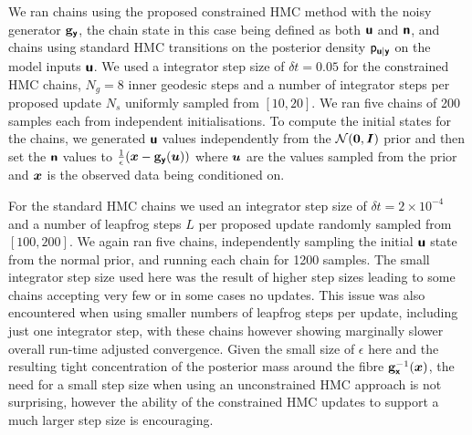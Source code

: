 
We ran chains using the proposed constrained \ac{HMC} method with the noisy generator ${\mathbf{g}}_{\boldsymbol{\mathsf{y}}}$, the chain state in this case being defined as both $\boldsymbol{\mathsf{u}}$ and $\boldsymbol{\mathsf{n}}$, and chains using standard \ac{HMC} transitions on the posterior density $\mathsf{p}_{\boldsymbol{\mathsf{u}}|\boldsymbol{\mathsf{y}}}$ on the model inputs $\boldsymbol{\mathsf{u}}$. We used a integrator step size of $\delta t = 0.05$ for the constrained \ac{HMC} chains, $N_g = 8$ inner geodesic steps and a number of integrator steps per proposed update $N_s$ uniformly sampled from $[10,20]$. We ran five chains of 200 samples each from independent initialisations. To compute the initial states for the chains, we generated $\boldsymbol{\mathsf{u}}$ values independently from the $\nrm{\vct{0},\mtx{I}}$ prior and then set the $\boldsymbol{\mathsf{n}}$ values to $\frac{1}{\epsilon} \lpa\vct{x} - \genfunc_{\rvct{y}}(\vct{u})\rpa$ where $\boldsymbol{u}$ are the values sampled from the prior and $\boldsymbol{x}$ is the observed data being conditioned on. 

For the standard \ac{HMC} chains we used an integrator step size of $\delta t = 2 \times 10^{-4}$ and a number of leapfrog steps $L$ per proposed update randomly sampled from $[100,200]$. We again ran five chains, independently sampling the initial $\boldsymbol{\mathsf{u}}$ state from the normal prior, and running each chain for 1200 samples. The small integrator step size used here was the result of higher step sizes leading to some chains accepting very few or in some cases no updates. This issue was also encountered when using smaller numbers of leapfrog steps per update, including just one integrator step, with these chains however showing marginally slower overall run-time adjusted convergence. Given the small size of $\epsilon$ here and the resulting tight concentration of the posterior mass around the fibre ${\mathbf{g}}_{\boldsymbol{\mathsf{x}}}^{-1}(\boldsymbol{x})$, the need for a small step size when using an unconstrained \ac{HMC} approach is not surprising, however the ability of the constrained \ac{HMC} updates to support a much larger step size is encouraging. %

